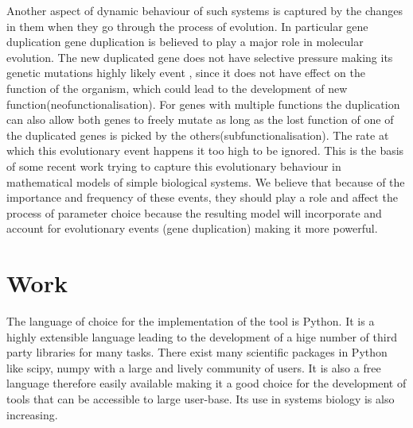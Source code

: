 \documentclass[12pt,a4paper,titlepage]{article}
\begin{document}
 Another aspect of dynamic behaviour of such systems is captured by the changes in them when they go through the process of evolution.  In particular gene duplication gene duplication is believed to play a major role in molecular evolution. The new duplicated gene does not have selective pressure making its genetic mutations highly likely event , since it does not have effect on the function of the organism, which could lead to the development of new function(neofunctionalisation). For genes with multiple functions the duplication can also allow both genes to freely mutate as long as the lost function of one of the duplicated genes is picked by the others(subfunctionalisation). The rate at which this evolutionary event happens it too high to be ignored\cite{lipinski2011high}. This is the basis of some recent work trying to capture this evolutionary behaviour in mathematical models of simple biological systems\cite{das2012dupl}. We believe that because of the importance and frequency of these events, they should play a role and affect the process of parameter choice because the resulting model will incorporate and account for evolutionary events (gene duplication) making it more powerful.
\section{Work}
The language of choice for the implementation of the tool is Python. It is a highly extensible language leading to the development of a hige number of third party libraries for many tasks. There exist many scientific packages in Python like scipy\cite{scipy}, numpy with a large and lively community of users. It is also a free language therefore easily available making it a good choice for the development of tools that can be accessible to large user-base. Its use in systems biology is also increasing\cite{myers2007python, olivier2002modelling}.
\end{document}

